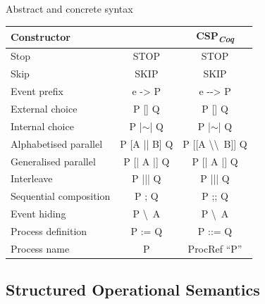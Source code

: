 \documentclass[t]{beamer}
\newcommand{\CSPcoq}{CSP\textsubscript{\textit{Coq}}}
\begin{document}
\begin{frame}{Abstract and concrete syntax}
	\begin{table}[htb]
		\scriptsize
		\begin{center}
			\begin{tabular}{ |l||c|c| }
				\hline
				\textbf{Constructor} & \textbf{\CSPM{}} & \textbf{\CSPcoq{}} \\
				\hline\hline
				Stop & STOP & STOP \\ [0.5ex]
				Skip & SKIP & SKIP \\ [0.5ex]
				Event prefix & e -> P & e -{}-> P \\  [0.5ex]
				External choice & P [] Q & P [] Q \\  [0.5ex]
				Internal choice & P |$ \sim $| Q & P |$ \sim $| Q \\ [0.5ex]
				Alphabetised parallel & P [A || B] Q & P [[A \textbackslash\textbackslash \ B]] Q \\ [0.5ex]
				Generalised parallel & P [| A |] Q & P [| A |] Q \\ [0.5ex]
				Interleave & P ||| Q & P ||| Q \\ [0.5ex]
				Sequential composition & P ; Q & P ;; Q \\ [0.5ex]
				Event hiding & P \textbackslash \ A & P \textbackslash \ A \\ [0.5ex]
				Process definition & P := Q & P ::= Q \\ [0.5ex]
				Process name & P & ProcRef ``P'' \\ [0.5ex]
				\hline
			\end{tabular}
		\end{center}
	\end{table}
\end{frame}

\subsection{Structured Operational Semantics}
\end{document}
